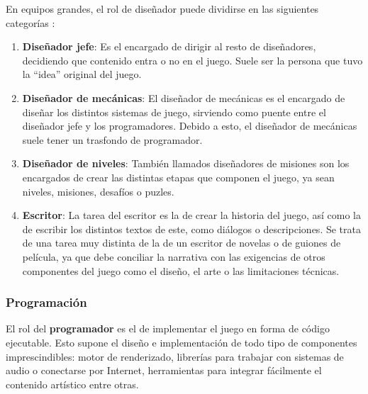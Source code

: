 En equipos grandes, el rol de diseñador puede dividirse en las siguientes categorías \cite{development_and_production}:
\begin{enumerate}
\item \textbf{Diseñador jefe}: Es el encargado de dirigir al resto de diseñadores, decidiendo que contenido entra o no en el juego. Suele ser la persona que tuvo la ``idea'' original del juego.
\item \textbf{Diseñador de mecánicas}: El diseñador de mecánicas es el encargado de diseñar los distintos sistemas de juego, sirviendo como puente entre el diseñador jefe y los programadores. Debido a esto, el diseñador de mecánicas suele tener un trasfondo de programador.
\item \textbf{Diseñador de niveles}: También llamados diseñadores de misiones son los encargados de crear las distintas etapas que componen el juego, ya sean niveles, misiones, desafíos o puzles.
\item \textbf{Escritor}: La tarea del escritor es la de crear la historia del juego, así como la de escribir los distintos textos de este, como diálogos o descripciones. Se trata de una tarea muy distinta de la de un escritor de novelas o de guiones de película, ya que debe conciliar la narrativa con las exigencias de otros componentes del juego como el diseño, el arte o las limitaciones técnicas.
\end{enumerate}

\subsubsection{Programación}
El rol del \textbf{programador} es el de implementar el juego en forma de código ejecutable. Esto supone el diseño e implementación de todo tipo de componentes imprescindibles: motor de renderizado, librerías para trabajar con sistemas de audio o conectarse por Internet, herramientas para integrar fácilmente el contenido artístico entre otras.

